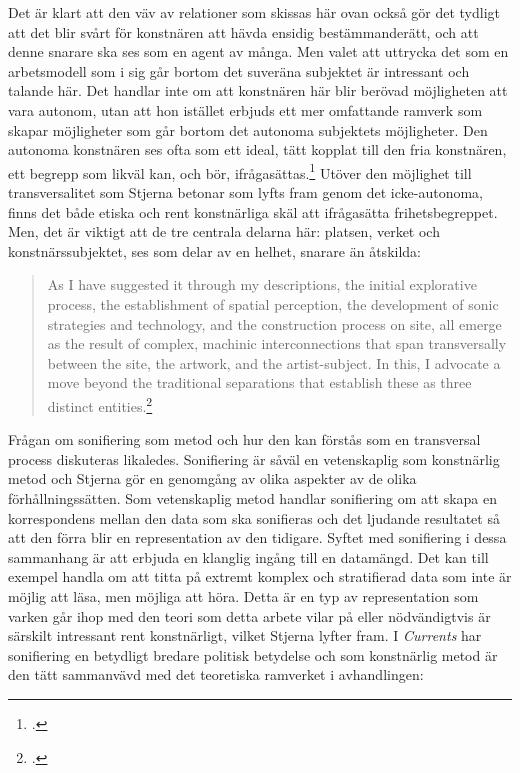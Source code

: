 \documentclass[11pt]{article}
\begin{document}
Det är klart att den väv av relationer som skissas här ovan också gör
det tydligt att det blir svårt för konstnären att hävda ensidig
bestämmanderätt, och att denne snarare ska ses som en agent av
många. Men valet att uttrycka det som en arbetsmodell som i sig går
bortom det suveräna subjektet är intressant och talande här. Det
handlar inte om att konstnären här blir berövad möjligheten att vara
autonom, utan att hon istället erbjuds ett mer omfattande ramverk som
skapar möjligheter som går bortom det autonoma subjektets
möjligheter. Den autonoma konstnären ses ofta som ett ideal, tätt
kopplat till den fria konstnären, ett begrepp som likväl kan, och bör,
ifrågasättas.\footcite[Se till exempel ][ sid. 21]{peters09} Utöver den
möjlighet till transversalitet som Stjerna betonar som lyfts fram
genom det icke-autonoma, finns det både etiska och rent konstnärliga skäl
att ifrågasätta frihetsbegreppet. Men, det är viktigt att de tre
centrala delarna här: platsen, verket och konstnärssubjektet, ses som
delar av en helhet, snarare än åtskilda:

\begin{quote}
    As I have suggested it through my descriptions, the initial
    explorative process, the establishment of spatial perception, the
    development of sonic strategies and technology, and the
    construction process on site, all emerge as the result of complex,
    machinic interconnections that span transversally between the
    site, the artwork, and the artist-subject. In this, I advocate a
    move beyond the traditional separations that establish these as
    three distinct entities.\footcite[sid. 92]{Stjerna2018}
\end{quote}

Frågan om sonifiering som metod och hur den kan förstås som en
transversal process diskuteras likaledes. Sonifiering är såväl en
vetenskaplig som konstnärlig metod och Stjerna gör en genomgång av
olika aspekter av de olika förhållningssätten. Som vetenskaplig metod
handlar sonifiering om att skapa en korrespondens mellan den data som
ska sonifieras och det ljudande resultatet så att den förra blir en
representation av den tidigare. Syftet med sonifiering i dessa
sammanhang är att erbjuda en klanglig ingång till en datamängd. Det
kan till exempel handla om att titta på extremt komplex och
stratifierad data som inte är möjlig att läsa, men möjliga att
höra. Detta är en typ av representation som varken går ihop med den
teori som detta arbete vilar på eller nödvändigtvis är särskilt
intressant rent konstnärligt, vilket Stjerna lyfter fram. I
\emph{Currents} har sonifiering en betydligt bredare politisk
betydelse och som konstnärlig metod är den tätt sammanvävd
med det teoretiska ramverket i avhandlingen:
\end{document}

